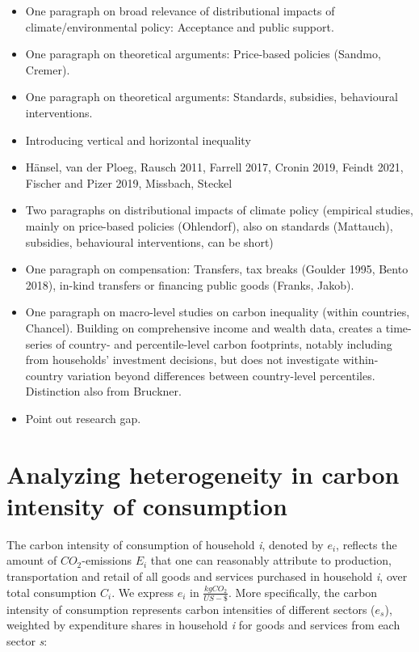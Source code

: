 \documentclass[12pt, a4paper]{article}
\begin{document}
\begin{itemize}
    \item One paragraph on broad relevance of distributional impacts of climate/environmental policy: Acceptance and public support.
    \item One paragraph on theoretical arguments: Price-based policies (Sandmo, Cremer).
    \item One paragraph on theoretical arguments: Standards, subsidies, behavioural interventions.
    \item Introducing vertical and horizontal inequality
  \item Hänsel, van der Ploeg, Rausch 2011, Farrell 2017, Cronin 2019, Feindt 2021, Fischer and Pizer 2019, Missbach, Steckel
  \item Two paragraphs on distributional impacts of climate policy (empirical studies, mainly on price-based policies (Ohlendorf), also on standards (Mattauch), subsidies, behavioural interventions, can be short)
  \item One paragraph on compensation: Transfers, tax breaks (Goulder 1995, Bento 2018), in-kind transfers or financing public goods (Franks, Jakob).
  \item One paragraph on macro-level studies on carbon inequality (within countries, Chancel). Building on comprehensive income and wealth data, \textcite{Chancel.2022} creates a time-series of country- and percentile-level carbon footprints, notably including from households' investment decisions, but does not investigate within-country variation beyond differences between country-level percentiles. Distinction also from Bruckner.
  \item Point out research gap.

\end{itemize}

\section{Analyzing heterogeneity in carbon intensity of consumption} \label{sec:methods}


The carbon intensity of consumption of household \textit{i}, denoted by $e_{i}$, reflects the amount of $CO_{2}$-emissions $E_{i}$ that one can reasonably attribute to production, transportation and retail of all goods and services purchased in household \textit{i}, over total consumption $C_{i}$. We express $e_{i}$ in $\frac{kgCO_{2}}{US-\$}$. More specifically, the carbon intensity of consumption represents carbon intensities of different sectors ($e_{s}$), weighted by expenditure shares in household \textit{i} for goods and services from each sector \textit{s}:
\end{document}
